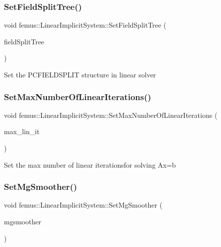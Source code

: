 \subsubsection{\texorpdfstring{Set\+Field\+Split\+Tree()}{SetFieldSplitTree()}}
{\footnotesize\ttfamily void femus\+::\+Linear\+Implicit\+System\+::\+Set\+Field\+Split\+Tree (\begin{DoxyParamCaption}\item[{\mbox{\hyperlink{classfemus_1_1_field_split_tree}{Field\+Split\+Tree}} $\ast$}]{field\+Split\+Tree }\end{DoxyParamCaption})}

Set the P\+C\+F\+I\+E\+L\+D\+S\+P\+L\+IT structure in linear solver \mbox{\label{classfemus_1_1_linear_implicit_system_aac52d38a95ff85409abd6e2d92a7c73a}} 
\subsubsection{\texorpdfstring{Set\+Max\+Number\+Of\+Linear\+Iterations()}{SetMaxNumberOfLinearIterations()}}
{\footnotesize\ttfamily void femus\+::\+Linear\+Implicit\+System\+::\+Set\+Max\+Number\+Of\+Linear\+Iterations (\begin{DoxyParamCaption}\item[{unsigned int}]{max\+\_\+lin\+\_\+it }\end{DoxyParamCaption})\hspace{0.3cm}{\ttfamily [inline]}}

Set the max number of linear iterationsfor solving Ax=b \mbox{\label{classfemus_1_1_linear_implicit_system_a7ad7aa275975394d87447583dc788ca4}} 
\subsubsection{\texorpdfstring{Set\+Mg\+Smoother()}{SetMgSmoother()}}
{\footnotesize\ttfamily void femus\+::\+Linear\+Implicit\+System\+::\+Set\+Mg\+Smoother (\begin{DoxyParamCaption}\item[{const \mbox{\hyperlink{_mg_smoother_enum_8hpp_a4d11c2ff93e2f0f440c879a9c40cda71}{Mg\+Smoother}}}]{mgsmoother }\end{DoxyParamCaption})}

